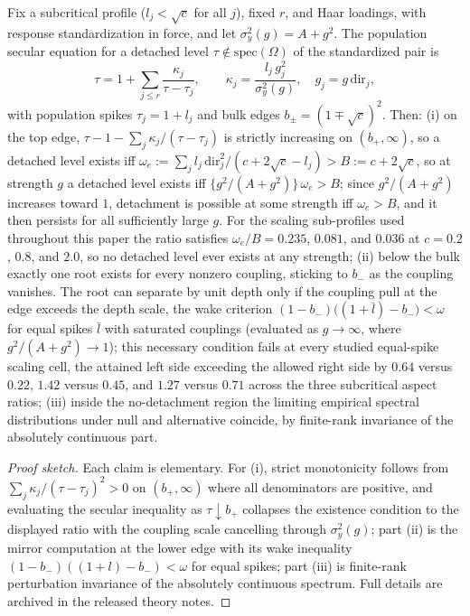 \begin{proposition}
\label{prop:detach}
Fix a subcritical profile ($l_j<\sqrt c$ for all $j$), fixed $r$, and Haar loadings, with response standardization in force, and let $\sigma_y^2(g)=A+g^2$. The population secular equation for a detached level $\tau\notin\mathrm{spec}(\Omega)$ of the standardized pair is
\[
\tau=1+\sum_{j\le r}\frac{\kappa_j}{\tau-\tau_j},
\qquad
\kappa_j=\frac{l_j\,g_j^2}{\sigma_y^2(g)},\quad g_j=g\,\mathrm{dir}_j,
\]
with population spikes $\tau_j=1+l_j$ and bulk edges $b_\pm=(1\mp\sqrt c)^2$. Then: (i) on the top edge, $\tau-1-\sum_j\kappa_j/(\tau-\tau_j)$ is strictly increasing on $(b_+,\infty)$, so a detached level exists iff
$\omega_e:=\sum_j l_j\,\mathrm{dir}_j^2/(c+2\sqrt c-l_j) > B:=c+2\sqrt c$,
so at strength $g$ a detached level exists iff $\{g^2/(A+g^2)\}\,\omega_e>B$; since $g^2/(A+g^2)$ increases toward $1$, detachment is possible at some strength iff $\omega_e>B$, and it then persists for all sufficiently large $g$. For the scaling sub-profiles used throughout this paper the ratio satisfies $\omega_e/B = 0.235$, $0.081$, and $0.036$ at $c=0.2$, $0.8$, and $2.0$, so no detached level ever exists at any strength; (ii) below the bulk exactly one root exists for every nonzero coupling, sticking to $b_-$ as the coupling vanishes. The root can separate by unit depth only if the coupling pull at the edge exceeds the depth scale, the wake criterion $(1-b_-)\bigl((1+\bar l)-b_-\bigr)<\omega$ for equal spikes $\bar l$ with saturated couplings (evaluated as $g\to\infty$, where $g^2/(A+g^2)\to1$); this necessary condition fails at every studied equal-spike scaling cell, the attained left side exceeding the allowed right side by $0.64$ versus $0.22$, $1.42$ versus $0.45$, and $1.27$ versus $0.71$ across the three subcritical aspect ratios; (iii) inside the no-detachment region the limiting empirical spectral distributions under null and alternative coincide, by finite-rank invariance of the absolutely continuous part.
\end{proposition}

\begin{proof}[Proof sketch]
Each claim is elementary. For (i), strict monotonicity follows from $\sum_j\kappa_j/(\tau-\tau_j)^2>0$ on $(b_+,\infty)$ where all denominators are positive, and evaluating the secular inequality as $\tau\downarrow b_+$ collapses the existence condition to the displayed ratio with the coupling scale cancelling through $\sigma_y^2(g)$; part (ii) is the mirror computation at the lower edge with its wake inequality $(1-b_-)((1+l)-b_-)<\omega$ for equal spikes; part (iii) is finite-rank perturbation invariance of the absolutely continuous spectrum. Full details are archived in the released theory notes.
\end{proof}

